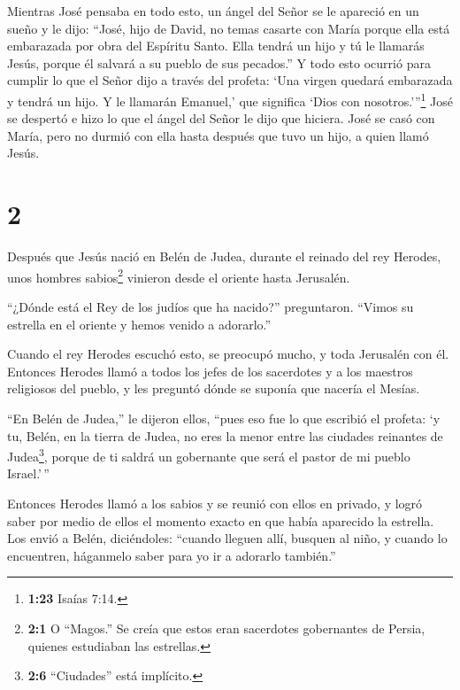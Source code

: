  Mientras José pensaba en todo esto, un ángel del Señor se
le apareció en un sueño y le dijo: ``José, hijo de David, no temas
casarte con María porque ella está embarazada por obra del Espíritu
Santo.  Ella tendrá un hijo y tú le llamarás Jesús, porque
él salvará a su pueblo de sus pecados.''  Y todo esto
ocurrió para cumplir lo que el Señor dijo a través del profeta:
 `Una virgen quedará embarazada y tendrá un hijo. Y le
llamarán Emanuel,' que significa `Dios con nosotros.'''\footnote{\textbf{1:23}
  Isaías 7:14.}  José se despertó e hizo lo que el ángel
del Señor le dijo que hiciera.  José se casó con María,
pero no durmió con ella hasta después que tuvo un hijo, a quien llamó
Jesús.

\hypertarget{section-1}{%
\section{2}\label{section-1}}

 Después que Jesús nació en Belén de Judea, durante el
reinado del rey Herodes, unos hombres sabios\footnote{\textbf{2:1} O
  ``Magos.'' Se creía que estos eran sacerdotes gobernantes de Persia,
  quienes estudiaban las estrellas.} vinieron desde el oriente hasta
Jerusalén.

 ``¿Dónde está el Rey de los judíos que ha nacido?''
preguntaron. ``Vimos su estrella en el oriente y hemos venido a
adorarlo.''

 Cuando el rey Herodes escuchó esto, se preocupó mucho, y
toda Jerusalén con él.  Entonces Herodes llamó a todos los
jefes de los sacerdotes y a los maestros religiosos del pueblo, y les
preguntó dónde se suponía que nacería el Mesías.

 ``En Belén de Judea,'' le dijeron ellos, ``pues eso fue lo
que escribió el profeta:  `y tu, Belén, en la tierra de
Judea, no eres la menor entre las ciudades reinantes de
Judea\footnote{\textbf{2:6} ``Ciudades'' está implícito.}, porque de ti
saldrá un gobernante que será el pastor de mi pueblo Israel.'\,''

 Entonces Herodes llamó a los sabios y se reunió con ellos
en privado, y logró saber por medio de ellos el momento exacto en que
había aparecido la estrella.  Los envió a Belén,
diciéndoles: ``cuando lleguen allí, busquen al niño, y cuando lo
encuentren, háganmelo saber para yo ir a adorarlo también.''

